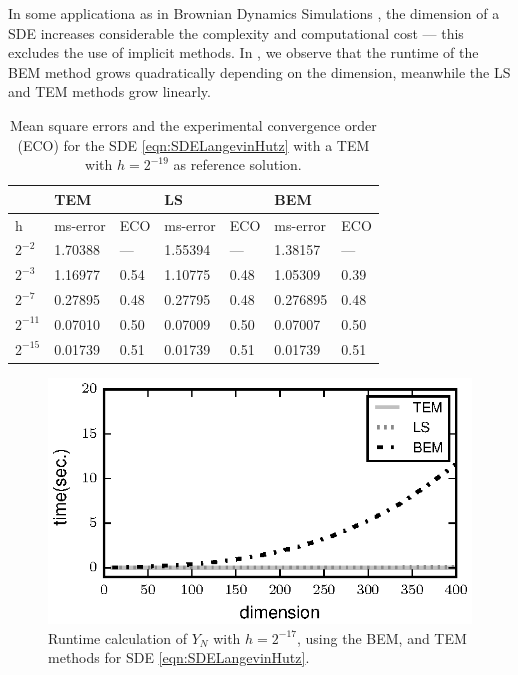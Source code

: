 \begin{example}
		In some applicationa as in Brownian Dynamics Simulations \cite{Cruz2012}, the dimension of a SDE
	increases considerable the complexity and computational cost --- this excludes the use of implicit methods.
	In , we observe that the runtime of the BEM method grows quadratically depending
	on the dimension, meanwhile the LS and TEM methods grow linearly. 
	\begin{table}[t]
		\centering
		\begin{tabular}{lllllll}
			&        TEM &        	& LS		&           & BEM		 &         \\
			\toprule
			h		& ms-error	 & ECO 		& ms-error	    & ECO		& ms-error	 &	ECO	  \\
			\midrule
			$2^{-2}$	& \num{1.70388}    & ---		&\num{1.55394}		& ---		& \num{1.38157}	& 
			--- \\
			$2^{-3}$	& \num{1.16977}    & \num{0.54}     &\num{1.10775}    & \num{0.48} & \num{1.05309}	& 
			\num{0.39} \\ 
			$2^{-7}$	&\num{0.27895}     & \num{0.48} & \num{0.27795}   & \num{0.48} & \num{0.276895}& 
			\num{0.48} \\
			$2^{-11}$	& \num{0.07010}  & \num{0.50} & \num{0.07009}  & \num{0.50} & \num{0.07007} & 
			\num{0.50} \\
			$2^{-15}$	& \num{0.01739}  & \num{0.51} & \num{0.01739}  & \num{0.51} & \num{0.01739}& 
			\num{0.51} \\
			\bottomrule
		\end{tabular}
		\caption{
			Mean square errors and the experimental convergence order (ECO) for the SDE \eqref{eqn:SDELangevinHutz} 
			with a TEM with $h = 2^{-19}$ as reference solution.
		}\label{tbl:OrdersLS}
	\end{table}
	\begin{figure}[t]
		\centering
			\includegraphics{./papers/paperB/figures/TimeVsDimension}
		\caption{
			Runtime calculation of $Y_N$ with $h=2^{-17}$, using the BEM,  \SM and TEM methods for 
			SDE \eqref{eqn:SDELangevinHutz}.
		}
		\label{fig:TimeVsDimension}
	\end{figure}
\end{example}

